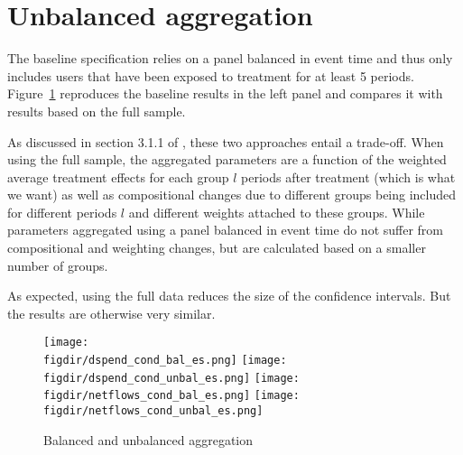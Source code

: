 
\section{Unbalanced aggregation}%
\label{sec:unbalanced_aggregation}

The baseline specification relies on a panel balanced in event time and
thus only includes users that have been exposed to treatment for at least 5
periods. Figure~\ref{fig:ub_comp} reproduces the baseline results in the left
panel and compares it with results based on the full sample.

As discussed in section 3.1.1 of \citet{callaway2021difference}, these two
approaches entail a trade-off. When using the full sample, the aggregated
parameters are a function of the weighted average treatment effects for each
group $l$ periods after treatment (which is what we want) as well as
compositional changes due to different groups being included for different
periods $l$ and different weights attached to these groups. While parameters
aggregated using a panel balanced in event time do not suffer from
compositional and weighting changes, but are calculated based on a smaller
number of groups.

As expected, using the full data reduces the size of the confidence intervals.
But the results are otherwise very similar.

\begin{figure}[h]
    \centering
    \caption{Balanced and unbalanced aggregation}%
    \label{fig:ub_comp}
    \texttt{[image: \\figdir/dspend\_cond\_bal\_es.png]}
    \texttt{[image: \\figdir/dspend\_cond\_unbal\_es.png]}
    \texttt{[image: \\figdir/netflows\_cond\_bal\_es.png]}
    \texttt{[image: \\figdir/netflows\_cond\_unbal\_es.png]}
\end{figure}



